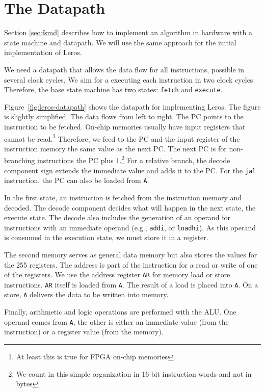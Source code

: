 \documentclass[%
    10pt,
    headinclude, footinclude=false,
    openright, %
    notitlepage,
    cleardoublepage=empty,
    headsepline,
    numbers=noenddot,
    bibliography=totoc, index=totoc,
    ]{scrbook}
\newcommand{\code}[1]{{\lstinline[basicstyle=\small\ttfamily]{#1}}}
\begin{document}
\section{The Datapath}

Section \ref{sec:fsmd} describes how to implement an algorithm in hardware with
a state machine and datapath. We will use the same approach for the initial
implementation of Leros.

We need a datapath that allows the data flow for all instructions, possible in several
clock cycles. We aim for a executing each instruction in two clock cycles.
Therefore, the base state machine has two states: \code{fetch} and \code{execute}.

Figure~\ref{fig:leros-datapath} shows the datapath for implementing Leros.
The figure is slightly simplified.
The data flows from left to right. The PC points to the instruction to be fetched.
On-chip memories usually have input registers that cannot be read.\footnote{At least
this is true for FPGA on-chip memories} Therefore, we feed to the PC and the input register
of the instruction memory the same value as the next PC. The next PC is for non-branching
instructions the PC plus 1.\footnote{We count in this simple organization in 16-bit instruction
words and not in bytes} For a relative branch, the decode component sign extends the immediate
value and adds it to the PC. For the \code{jal} instruction, the PC can also be loaded from \code{A}.

In the first state, an instruction is fetched from the instruction memory and decoded.
The decode component decides what will happen in the next state, the execute state.
The decode also includes the generation of an operand for instructions with an immediate operand
(e.g., \code{addi}, or \code{loadhi}). As this operand is consumed in the execution state,
we must store it in a register.

The second memory serves as general data memory but also stores the values for the
255 registers. The address is part of the instruction for a read or write of one of the registers.
We use the address register \code{AR} for memory load or store instructions.
\code{AR} itself is loaded from \code{A}. The result of a load is placed into \code{A}.
On a store, \code{A} delivers the data to be written into memory.

Finally, arithmetic and logic operations are performed with the ALU. One operand
comes from \code{A}, the other is either an immediate value (from the instruction)
or a register value (from the memory).
\end{document}

